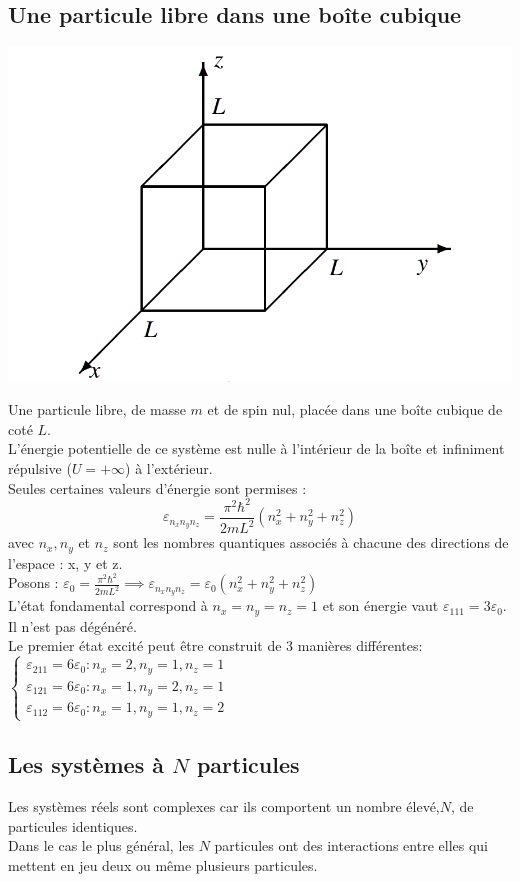 \documentclass[12pt,oneside]{book}
\begin{document}
\subsection{Une particule libre dans une boîte cubique}
\begin{center}
	\includegraphics[width=0.5\linewidth]{../pic/3306/4.png}
\end{center}
Une particule libre, de masse $m$ et de spin nul, placée dans une boîte cubique de coté $L$.\\
L'énergie potentielle de ce système est nulle à l'intérieur de la boîte et infiniment répulsive ($U = +\infty$) à l'extérieur.\\
Seules certaines valeurs d'énergie sont permises :
\[ \varepsilon_{n_x n_y n_z} = \frac{\pi^2\hbar^2}{2mL^2}(n_x^2 + n_y^2 + n_z^2) \]
avec $n_x,n_y$ et $n_z$ sont les nombres quantiques associés à chacune des directions de l'espace : x, y et z.\\
Posons : $\varepsilon_0 = \frac{\pi^2\hbar^2}{2mL^2} \implies \varepsilon_{n_x n_y n_z} = \varepsilon_0(n_x^2 + n_y^2 + n_z^2)$\\
L'état fondamental correspond à $n_x = n_y = n_z = 1$ et son énergie vaut $\varepsilon_{111} = 3\varepsilon_0$. Il n'est pas dégénéré.\\
Le premier état excité peut être construit de 3 manières différentes:\\
$\begin{cases}
		\varepsilon_{211} =6\varepsilon_0 : n_x =2, n_y = 1, n_z =1 \\
		\varepsilon_{121} =6\varepsilon_0 : n_x =1, n_y = 2, n_z =1 \\
		\varepsilon_{112} =6\varepsilon_0 : n_x =1, n_y = 1, n_z =2
	\end{cases}$
\subsection{Les systèmes à $N$ particules}
Les systèmes réels sont complexes car ils comportent un nombre élevé,$N$, de particules identiques.\\
Dans le cas le plus général, les $N$ particules ont des interactions entre elles qui mettent en jeu deux ou même plusieurs particules.\\
\end{document}

